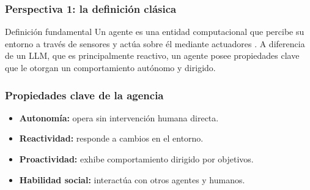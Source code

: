 \documentclass[handout]{beamer}
\begin{document}
\begin{frame}
  \frametitle{Perspectiva 1: la definición clásica}
  \begin{block}{Definición fundamental}
    Un agente es una entidad computacional que percibe su entorno a través de sensores y actúa sobre él mediante actuadores \parencite[citado en][]{russell1995artificial, krishnan2025aiagentsevolutionarchitecture}. A diferencia de un LLM, que es principalmente reactivo, un agente posee propiedades clave que le otorgan un comportamiento autónomo y dirigido.
  \end{block}
\end{frame}

\begin{frame}
  \frametitle{Propiedades clave de la agencia}
  \begin{alertblock}{}
    \begin{itemize}
        \item \textbf{Autonomía:} opera sin intervención humana directa.
        \item \textbf{Reactividad:} responde a cambios en el entorno.
        \item \textbf{Proactividad:} exhibe comportamiento dirigido por objetivos.
        \item \textbf{Habilidad social:} interactúa con otros agentes y humanos.
    \end{itemize}
    \raggedleft\footnotesize{\parencite[citado en][]{wooldridge1995intelligent, krishnan2025aiagentsevolutionarchitecture}}
  \end{alertblock}
\end{frame}
\end{document}
